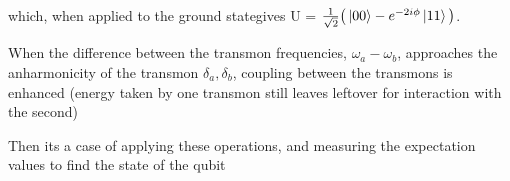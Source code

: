   
  \noindent which, when applied to the ground stategives U = $ \frac{1}{\sqrt{2}}\big(\Ket{00}-e^{-2i\phi}\Ket{11}\big) $.
  
  When the difference between the transmon frequencies, $ \omega_a-\omega_b $, approaches the anharmonicity of the transmon $ \delta_a, \delta_b $, coupling between the transmons is enhanced (energy taken by one transmon still leaves leftover for interaction with the second)
  
  Then its a case of applying these operations, and measuring the expectation values to find the state of the qubit 
  
  
 